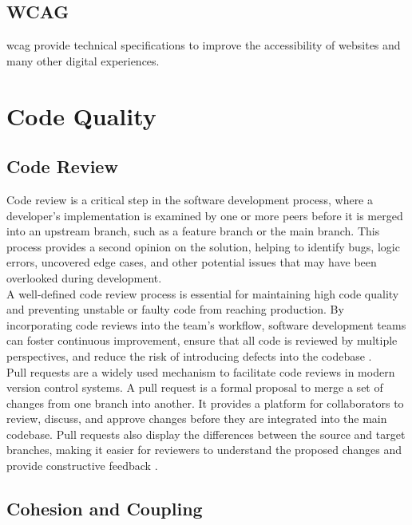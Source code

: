 {\subsection{WCAG}
\label{subsec:wcag}

\gls{wcag} provide technical specifications to improve the accessibility of websites and many other digital experiences. \cite{levelaccess:wcag}

\section{Code Quality}
\label{sec:code-quality}

\subsection{Code Review}
\label{subsec:code-review}

Code review is a critical step in the software development process, where a developer's implementation is examined by one or more peers before it is merged into an upstream branch, such as a feature branch or the main branch. This process provides a second opinion on the solution, helping to identify bugs, logic errors, uncovered edge cases, and other potential issues that may have been overlooked during development. \cite{gitlab:code-review} \\

A well-defined code review process is essential for maintaining high code quality and preventing unstable or faulty code from reaching production. By incorporating code reviews into the team's workflow, software development teams can foster continuous improvement, ensure that all code is reviewed by multiple perspectives, and reduce the risk of introducing defects into the codebase \cite{gitlab:code-review}. \\

Pull requests are a widely used mechanism to facilitate code reviews in modern version control systems. A pull request is a formal proposal to merge a set of changes from one branch into another. It provides a platform for collaborators to review, discuss, and approve changes before they are integrated into the main codebase. Pull requests also display the differences between the source and target branches, making it easier for reviewers to understand the proposed changes and provide constructive feedback \cite{github:pr}.

\subsection{Cohesion and Coupling}
\label{subsec:cohesion-and-coupling}

}
